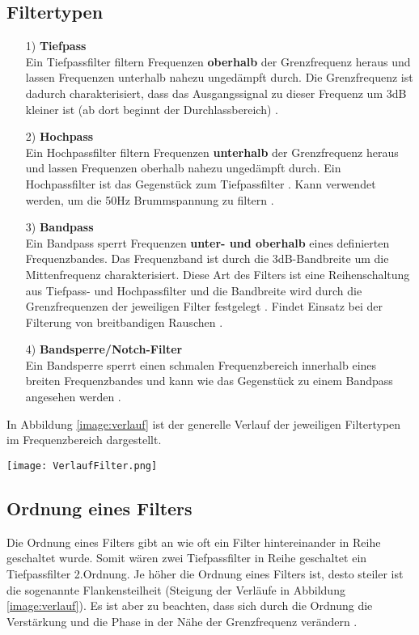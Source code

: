 \subsection*{Filtertypen}
\begin{itemize}
    \item[1)]\textbf{Tiefpass}\\
    Ein Tiefpassfilter filtern Frequenzen \textbf{oberhalb} der Grenzfrequenz heraus und lassen Frequenzen unterhalb nahezu ungedämpft durch. Die Grenzfrequenz ist dadurch charakterisiert, dass das Ausgangssignal zu dieser Frequenz um 3dB kleiner ist (ab dort beginnt der Durchlassbereich) \citep{electronik}.
    \item[2)]\textbf{Hochpass}\\
    Ein Hochpassfilter filtern Frequenzen \textbf{unterhalb} der Grenzfrequenz heraus und lassen Frequenzen oberhalb nahezu ungedämpft durch. Ein Hochpassfilter ist das Gegenstück zum Tiefpassfilter \citep{electronik}. Kann verwendet werden, um die 50Hz Brummspannung zu filtern \citep{VA}.
    \item[3)]\textbf{Bandpass}\\
    Ein Bandpass sperrt Frequenzen \textbf{unter- und oberhalb} eines definierten Frequenzbandes. Das Frequenzband ist durch die 3dB-Bandbreite um die Mittenfrequenz charakterisiert. Diese Art des Filters ist eine Reihenschaltung aus Tiefpass- und Hochpassfilter und die Bandbreite wird durch die Grenzfrequenzen der jeweiligen Filter festgelegt \citep{electronik}. Findet Einsatz bei der Filterung von breitbandigen Rauschen \citep{VA}.
    \item[4)]\textbf{Bandsperre/Notch-Filter}\\
    Ein Bandsperre sperrt einen schmalen Frequenzbereich innerhalb eines breiten Frequenzbandes und kann wie das Gegenstück zu einem Bandpass angesehen werden \citep{electronik}.
\end{itemize}
In Abbildung \ref{image:verlauf} ist der generelle Verlauf der jeweiligen Filtertypen im Frequenzbereich dargestellt.
\newpage
\begin{center}
    \texttt{[image: VerlaufFilter.png]}
    \label{image:verlauf}
\end{center}
\subsection*{Ordnung eines Filters}
Die Ordnung eines Filters gibt an wie oft ein Filter hintereinander in Reihe geschaltet wurde. Somit wären zwei Tiefpassfilter in Reihe geschaltet ein Tiefpassfilter 2.Ordnung. Je höher die Ordnung eines Filters ist, desto steiler ist die sogenannte Flankensteilheit (Steigung der Verläufe in Abbildung \ref{image:verlauf}). Es ist aber zu beachten, dass sich durch die Ordnung die Verstärkung und die Phase in der Nähe der Grenzfrequenz verändern \citep{electronik}.
